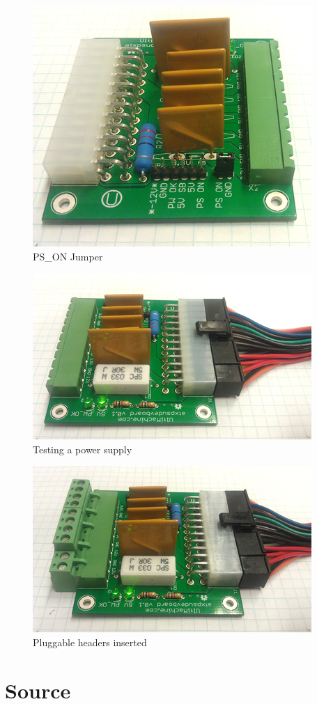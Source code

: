 \begin{figure}[htbp]
\centering
\includegraphics{./png/step-10.png}
\caption{PS\_ON Jumper}
\end{figure}

\begin{figure}[htbp]
\centering
\includegraphics{./png/step-11.png}
\caption{Testing a power supply}
\end{figure}

\begin{figure}[htbp]
\centering
\includegraphics{./png/step-12.png}
\caption{Pluggable headers inserted}
\end{figure}

\section{Source}
